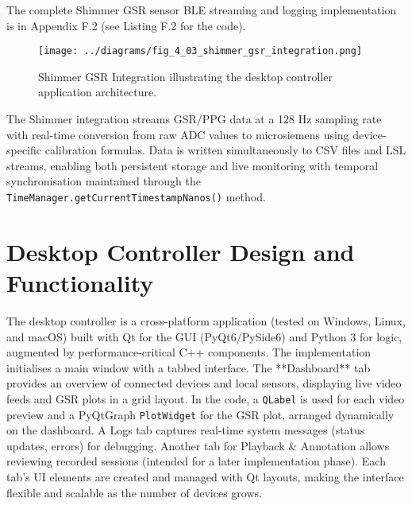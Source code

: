 The complete Shimmer GSR sensor BLE streaming and logging implementation is in Appendix F.2 (see Listing F.2 for the code).

\begin{figure}[htbp]
    \centring
    \texttt{[image: ../diagrams/fig\_4\_03\_shimmer\_gsr\_integration.png]}
    \caption{Shimmer GSR Integration illustrating the desktop controller application architecture.}
    \label{fig:4_03_shimmer_gsr_integration}
\end{figure}

The Shimmer integration streams GSR/PPG data at a 128 Hz sampling rate with real-time conversion from raw ADC values to microsiemens using device-specific calibration formulas. Data is written simultaneously to CSV files and LSL streams, enabling both persistent storage and live monitoring with temporal synchronisation maintained through the \texttt{TimeManager.getCurrentTimestampNanos()} method.


\section{Desktop Controller Design and Functionality}\label{sec:4-3}
The desktop controller is a cross-platform application (tested on Windows, Linux, and macOS) built with Qt for the GUI (PyQt6/PySide6) \cite{ref17} and Python 3 for logic, augmented by performance-critical C++ components. The implementation initialises a main window with a tabbed interface. The **Dashboard** tab provides an overview of connected devices and local sensors, displaying live video feeds and GSR plots in a grid layout. In the code, a \texttt{QLabel} is used for each video preview and a PyQtGraph \texttt{PlotWidget} for the GSR plot, arranged dynamically on the dashboard. A Logs tab captures real-time system messages (status updates, errors) for debugging. Another tab for Playback \& Annotation allows reviewing recorded sessions (intended for a later implementation phase). Each tab's UI elements are created and managed with Qt layouts, making the interface flexible and scalable as the number of devices grows.

